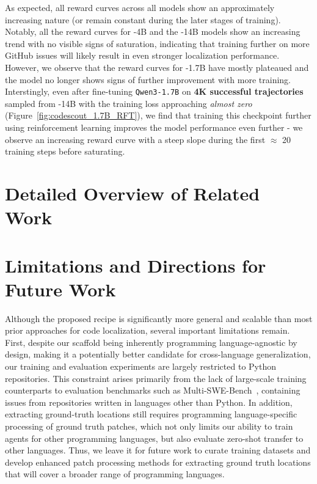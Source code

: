 As expected, all reward curves across all models show an approximately increasing nature (or remain constant during the later stages of training). Notably, all the reward curves for \methodname-4B and the \methodname-14B models show an increasing trend with no visible signs of saturation, indicating that training further on more GitHub issues will likely result in even stronger localization performance. However, we observe that the reward curves for \methodname-1.7B have mostly plateaued and the model no longer shows signs of further improvement with more training. Interstingly, even after fine-tuning \texttt{Qwen3-1.7B} on \textbf{4K successful trajectories} sampled from \methodname-14B with the training loss approaching \emph{almost zero} (Figure~\ref{fig:codescout_1.7B_RFT}), we find that training this checkpoint further using reinforcement learning improves the model performance even further - we observe an increasing reward curve with a steep slope during the first $\approx$ 20 training steps before saturating. 


\section{Detailed Overview of Related Work}\label{appendix:related_work_detailed}


\section{Limitations and Directions for Future Work}\label{appendix:future_work}
Although the proposed \methodname recipe is significantly more general and scalable than most prior approaches for code localization, several important limitations remain. First, despite our scaffold being inherently programming language-agnostic by design, making it a potentially better candidate for cross-language generalization, our training and evaluation experiments are largely restricted to Python repositories. This constraint arises primarily from the lack of large-scale training counterparts to evaluation benchmarks such as Multi-SWE-Bench~\citep{zan2025multiswebench}, containing issues from repositories written in languages other than Python. In addition, extracting ground-truth locations still requires programming language-specific processing of ground truth patches, which not only limits our ability to train agents for other programming languages, but also evaluate zero-shot transfer to other languages. Thus, we leave it for future work to curate training datasets and develop enhanced patch processing methods for extracting ground truth locations that will cover a broader range of programming languages.

